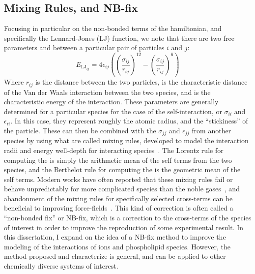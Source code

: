 \subsection{Mixing Rules, and NB-fix}
Focusing in particular on the non-bonded terms of the hamiltonian, and specifically the Lennard-Jones (LJ) function, we note that there are two
free parameters \sigmaij{} and \epsilonij{} between a particular pair of particles $i$ and $j$:
\begin{equation}
E_{\mathrm{LJ}_{ij}} = 4\epsilon_{ij} \left( \left( \frac{\sigma_{ij}}{r_{ij}} \right)^{12}
- \left( \frac{\sigma_{ij}}{r_{ij}} \right)^{6} \right)
\end{equation}
Where $r_{ij}$ is the distance between the two particles, \sigmaij{} is the characteristic distance of the Van der Waals interaction between the two species,
and \epsilonij{} is the characteristic energy of the interaction.
These parameters are generally determined for a particular species for the case of the self-interaction, or $\sigma_{ii}$ and $\epsilon_{ii}$.
In this case, they represent roughly the atomic radius, and the ``stickiness'' of the particle. These can then be combined with the 
$\sigma_{jj}$ and $\epsilon_{jj}$ from another species by using what are called mixing rules, developed to 
model the interaction radii and energy well-depth for interacting species~\cite{lorentz:1881,berthelot:1898}.
The Lorentz rule for computing the \sigmaij{} is simply the arithmetic mean of the self terms from the two species, and 
the Berthelot rule for computing the \epsilonij{} is the geometric mean of the self terms.
Modern works have often reported that these mixing rules fail
or behave unpredictably for more complicated species than the noble gases~\cite{fyta:2012,boda:2008:effects},
and abandonment of the mixing rules for specifically selected cross-terms can be beneficial to improving
force-fields~\cite{baker:2010:accurate,yoo:2012:improved,fyta:2012:ionic,mamatkulov:2013:force,venable:2013,
savelyev:2014:balancing,li:2015:representation,savelyev:2015:competition,jing:2017:study,reif:2017,wineman:2019}. This 
kind of correction is often called a ``non-bonded fix'' or NB-fix, which is a correction to the cross-terms of the species of interest 
in order to improve the reproduction of some experimental result.
In this dissertation, I expand on the idea of a NB-fix method to improve the modeling of the interactions of ions and phospholipid species.
However, the method proposed and characterize is general, and can be applied to other chemically diverse systems of interest.

